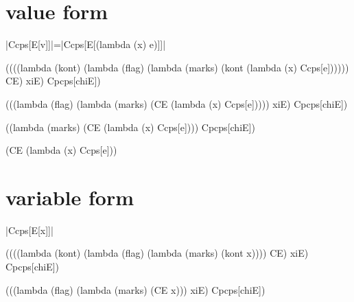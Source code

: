 \section{value form}

\noindent
\scheme|Ccps[E[v]]|=\scheme|Ccps[E[(lambda (x) e)]]|

\begin{schemeblock}
\begin{schemedisplay}
((((lambda (kont)
     (lambda (flag)
       (lambda (marks)
         (kont (lambda (x) Ccps[e])))))
   CE) xiE) Cpcps[chiE])
\end{schemedisplay}
\end{schemeblock}

\begin{schemeblock}
\begin{schemedisplay}
(((lambda (flag)
    (lambda (marks)
      (CE (lambda (x) Ccps[e]))))
  xiE) Cpcps[chiE])
\end{schemedisplay}
\end{schemeblock}

\begin{schemeblock}
\begin{schemedisplay}
((lambda (marks)
   (CE (lambda (x) Ccps[e])))
 Cpcps[chiE])
\end{schemedisplay}
\end{schemeblock}

\begin{schemeblock}
\begin{schemedisplay}
(CE (lambda (x) Ccps[e]))
\end{schemedisplay}
\end{schemeblock}

\section{variable form}

\noindent
\scheme|Ccps[E[x]]|
\begin{schemeblock}
\begin{schemedisplay}
((((lambda (kont)
     (lambda (flag)
       (lambda (marks)
         (kont x))))
   CE) xiE) Cpcps[chiE])
\end{schemedisplay}
\end{schemeblock}

\begin{schemeblock}
\begin{schemedisplay}
(((lambda (flag)
    (lambda (marks)
      (CE x)))
  xiE) Cpcps[chiE])
\end{schemedisplay}
\end{schemeblock}

